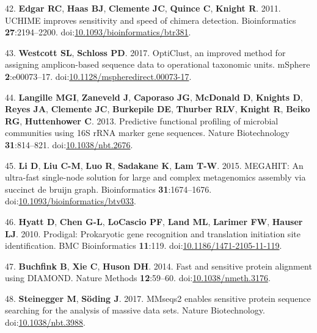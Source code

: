 \documentclass[11pt,]{article}
\begin{document}
\leavevmode\hypertarget{ref-Edgar2011}{}%
42. \textbf{Edgar RC}, \textbf{Haas BJ}, \textbf{Clemente JC},
\textbf{Quince C}, \textbf{Knight R}. 2011. UCHIME improves sensitivity
and speed of chimera detection. Bioinformatics \textbf{27}:2194--2200.
doi:\href{https://doi.org/10.1093/bioinformatics/btr381}{10.1093/bioinformatics/btr381}.

\leavevmode\hypertarget{ref-Westcott2017}{}%
43. \textbf{Westcott SL}, \textbf{Schloss PD}. 2017. OptiClust, an
improved method for assigning amplicon-based sequence data to
operational taxonomic units. mSphere \textbf{2}:e00073--17.
doi:\href{https://doi.org/10.1128/mspheredirect.00073-17}{10.1128/mspheredirect.00073-17}.

\leavevmode\hypertarget{ref-Langille2013}{}%
44. \textbf{Langille MGI}, \textbf{Zaneveld J}, \textbf{Caporaso JG},
\textbf{McDonald D}, \textbf{Knights D}, \textbf{Reyes JA},
\textbf{Clemente JC}, \textbf{Burkepile DE}, \textbf{Thurber RLV},
\textbf{Knight R}, \textbf{Beiko RG}, \textbf{Huttenhower C}. 2013.
Predictive functional profiling of microbial communities using 16S rRNA
marker gene sequences. Nature Biotechnology \textbf{31}:814--821.
doi:\href{https://doi.org/10.1038/nbt.2676}{10.1038/nbt.2676}.

\leavevmode\hypertarget{ref-Li2015}{}%
45. \textbf{Li D}, \textbf{Liu C-M}, \textbf{Luo R}, \textbf{Sadakane
K}, \textbf{Lam T-W}. 2015. MEGAHIT: An ultra-fast single-node solution
for large and complex metagenomics assembly via succinct de bruijn
graph. Bioinformatics \textbf{31}:1674--1676.
doi:\href{https://doi.org/10.1093/bioinformatics/btv033}{10.1093/bioinformatics/btv033}.

\leavevmode\hypertarget{ref-Hyatt2010}{}%
46. \textbf{Hyatt D}, \textbf{Chen G-L}, \textbf{LoCascio PF},
\textbf{Land ML}, \textbf{Larimer FW}, \textbf{Hauser LJ}. 2010.
Prodigal: Prokaryotic gene recognition and translation initiation site
identification. BMC Bioinformatics \textbf{11}:119.
doi:\href{https://doi.org/10.1186/1471-2105-11-119}{10.1186/1471-2105-11-119}.

\leavevmode\hypertarget{ref-Buchfink2014}{}%
47. \textbf{Buchfink B}, \textbf{Xie C}, \textbf{Huson DH}. 2014. Fast
and sensitive protein alignment using DIAMOND. Nature Methods
\textbf{12}:59--60.
doi:\href{https://doi.org/10.1038/nmeth.3176}{10.1038/nmeth.3176}.

\leavevmode\hypertarget{ref-Steinegger2017}{}%
48. \textbf{Steinegger M}, \textbf{Söding J}. 2017. MMseqs2 enables
sensitive protein sequence searching for the analysis of massive data
sets. Nature Biotechnology.
doi:\href{https://doi.org/10.1038/nbt.3988}{10.1038/nbt.3988}.
\end{document}
